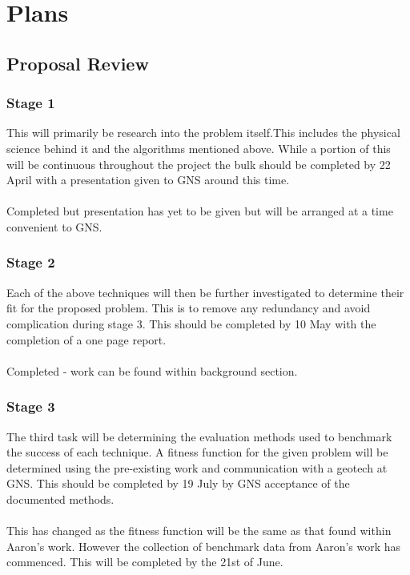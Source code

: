 \chapter{Plans}\label{C:con}

\section{Proposal Review}

\subsection{Stage 1} 
This will primarily be research into the problem itself.This includes the physical
science behind it and the algorithms mentioned above. While a portion of this will be
continuous throughout the project the bulk should be completed by 22 April with a
presentation given to GNS around this time.
\\\\
Completed but presentation has yet to be given but will be arranged at a time convenient to GNS.

\subsection{Stage 2} 
Each of the above techniques will then be further investigated to determine their fit for the proposed problem. This is to remove any redundancy and avoid complication during stage 3. This should be completed by 10 May with the completion of a one page report.
\\\\
Completed - work can be found within background section.

\subsection{Stage 3} 
The third task will be determining the evaluation methods used to benchmark the
success of each technique. A fitness function for the given problem will be determined
using the pre-existing work and communication with a geotech at GNS. This should
be completed by 19 July by GNS acceptance of the documented methods.
\\\\
This has changed as the fitness function will be the same as that found within Aaron's work. However the collection of benchmark data from Aaron's work has commenced. This will be completed by the 21st of June.

